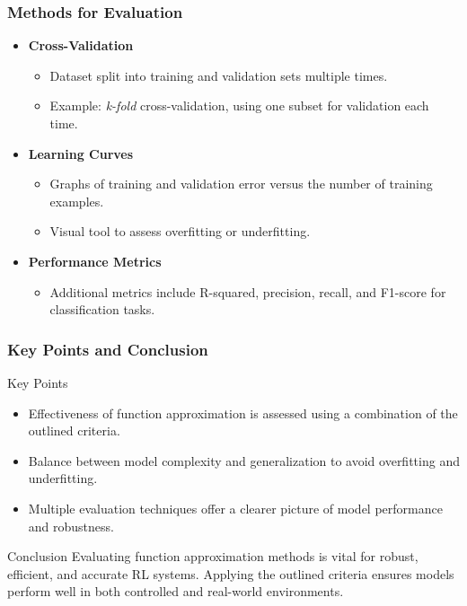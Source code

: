 \documentclass[aspectratio=169]{beamer}
\begin{document}
\begin{frame}[fragile]
  \frametitle{Methods for Evaluation}
  \begin{itemize}
    \item \textbf{Cross-Validation}
      \begin{itemize}
        \item Dataset split into training and validation sets multiple times.
        \item Example: \textit{k-fold} cross-validation, using one subset for validation each time.
      \end{itemize}
    
    \item \textbf{Learning Curves}
      \begin{itemize}
        \item Graphs of training and validation error versus the number of training examples.
        \item Visual tool to assess overfitting or underfitting.
      \end{itemize}
      
    \item \textbf{Performance Metrics}
      \begin{itemize}
        \item Additional metrics include R-squared, precision, recall, and F1-score for classification tasks.
      \end{itemize}
  \end{itemize}
\end{frame}

\begin{frame}[fragile]
  \frametitle{Key Points and Conclusion}
  \begin{block}{Key Points}
    \begin{itemize}
      \item Effectiveness of function approximation is assessed using a combination of the outlined criteria.
      \item Balance between model complexity and generalization to avoid overfitting and underfitting.
      \item Multiple evaluation techniques offer a clearer picture of model performance and robustness.
    \end{itemize}
  \end{block}
  
  \begin{block}{Conclusion}
    Evaluating function approximation methods is vital for robust, efficient, and accurate RL systems. Applying the outlined criteria ensures models perform well in both controlled and real-world environments.
  \end{block}
\end{frame}
\end{document}
